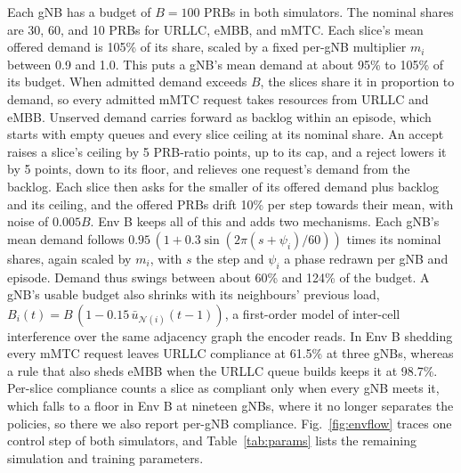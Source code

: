 \documentclass[pdflatex,sn-basic,Numbered]{sn-jnl}
\begin{document}
Each gNB has a budget of $B{=}100$ PRBs in both simulators. The nominal shares are 30, 60, and 10 PRBs for URLLC, eMBB, and mMTC. Each slice's mean offered demand is 105\% of its share, scaled by a fixed per-gNB multiplier $m_i$ between 0.9 and 1.0. This puts a gNB's mean demand at about 95\% to 105\% of its budget. When admitted demand exceeds $B$, the slices share it in proportion to demand, so every admitted mMTC request takes resources from URLLC and eMBB. Unserved demand carries forward as backlog within an episode, which starts with empty queues and every slice ceiling at its nominal share. An accept raises a slice's ceiling by 5 PRB-ratio points, up to its cap, and a reject lowers it by 5 points, down to its floor, and relieves one request's demand from the backlog. Each slice then asks for the smaller of its offered demand plus backlog and its ceiling, and the offered PRBs drift 10\% per step towards their mean, with noise of $0.005B$. Env B keeps all of this and adds two mechanisms. Each gNB's mean demand follows $0.95\,(1+0.3\sin(2\pi(s+\psi_i)/60))$ times its nominal shares, again scaled by $m_i$, with $s$ the step and $\psi_i$ a phase redrawn per gNB and episode. Demand thus swings between about 60\% and 124\% of the budget. A gNB's usable budget also shrinks with its neighbours' previous load, $B_i(t)=B\,(1-0.15\,\bar u_{\mathcal{N}(i)}(t-1))$, a first-order model of inter-cell interference over the same adjacency graph the encoder reads. In Env B shedding every mMTC request leaves URLLC compliance at 61.5\% at three gNBs, whereas a rule that also sheds eMBB when the URLLC queue builds keeps it at 98.7\%. Per-slice compliance counts a slice as compliant only when every gNB meets it, which falls to a floor in Env B at nineteen gNBs, where it no longer separates the policies, so there we also report per-gNB compliance. Fig.~\ref{fig:envflow} traces one control step of both simulators, and Table~\ref{tab:params} lists the remaining simulation and training parameters.
\end{document}
